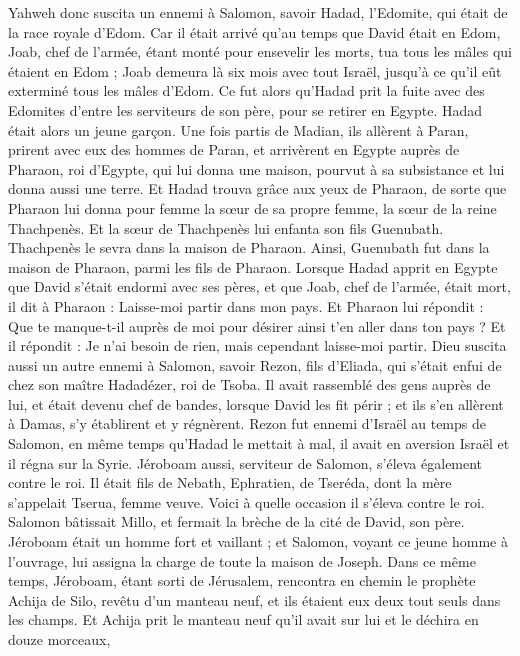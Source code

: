 \begin{multicols}{2}
Yahweh donc suscita un ennemi à Salomon, savoir Hadad, l'Edomite, qui était de la race royale d'Edom.
Car il était arrivé qu'au temps que David était en Edom, Joab, chef de l'armée, étant monté pour ensevelir les morts, tua tous les mâles qui étaient en Edom ;
Joab demeura là six mois avec tout Israël, jusqu'à ce qu'il eût exterminé tous les mâles d'Edom.
Ce fut alors qu'Hadad prit la fuite avec des Edomites d'entre les serviteurs de son père, pour se retirer en Egypte. Hadad était alors un jeune garçon.
Une fois partis de Madian, ils allèrent à Paran, prirent avec eux des hommes de Paran, et arrivèrent en Egypte auprès de Pharaon, roi d'Egypte, qui lui donna une maison, pourvut à sa subsistance et lui donna aussi une terre.
Et Hadad trouva grâce aux yeux de Pharaon, de sorte que Pharaon lui donna pour femme la sœur de sa propre femme, la sœur de la reine Thachpenès.
Et la sœur de Thachpenès lui enfanta son fils Guenubath. Thachpenès le sevra dans la maison de Pharaon. Ainsi, Guenubath fut dans la maison de Pharaon, parmi les fils de Pharaon.
Lorsque Hadad apprit en Egypte que David s'était endormi avec ses pères, et que Joab, chef de l'armée, était mort, il dit à Pharaon : Laisse-moi partir dans mon pays.
Et Pharaon lui répondit : Que te manque-t-il auprès de moi pour désirer ainsi t'en aller dans ton pays ? Et il répondit : Je n'ai besoin de rien, mais cependant laisse-moi partir.
Dieu suscita aussi un autre ennemi à Salomon, savoir Rezon, fils d'Eliada, qui s'était enfui de chez son maître Hadadézer, roi de Tsoba.
Il avait rassemblé des gens auprès de lui, et était devenu chef de bandes, lorsque David les fit périr ; et ils s'en allèrent à Damas, s'y établirent et y régnèrent.
Rezon fut ennemi d'Israël au temps de Salomon, en même temps qu'Hadad le mettait à mal, il avait en aversion Israël et il régna sur la Syrie.
Jéroboam aussi, serviteur de Salomon, s'éleva également contre le roi. Il était fils de Nebath, Ephratien, de Tseréda, dont la mère s'appelait Tserua, femme veuve.
Voici à quelle occasion il s'éleva contre le roi. Salomon bâtissait Millo, et fermait la brèche de la cité de David, son père.
Jéroboam était un homme fort et vaillant ; et Salomon, voyant ce jeune homme à l'ouvrage, lui assigna la charge de toute la maison de Joseph.
Dans ce même temps, Jéroboam, étant sorti de Jérusalem, rencontra en chemin le prophète Achija de Silo, revêtu d'un manteau neuf, et ils étaient eux deux tout seuls dans les champs.
Et Achija prit le manteau neuf qu'il avait sur lui et le déchira en douze morceaux,

\end{multicols}
